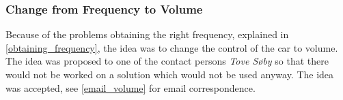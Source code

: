 \subsubsection{Change from Frequency to Volume}
Because of the problems obtaining the right frequency, explained in \cref{obtaining_frequency}, the idea was to change the control of the car to volume.
The idea was proposed to one of the contact persons \textit{Tove Søby} so that there would not be worked on a solution which would not be used anyway.
The idea was accepted, see \cref{email_volume} for email correspondence.